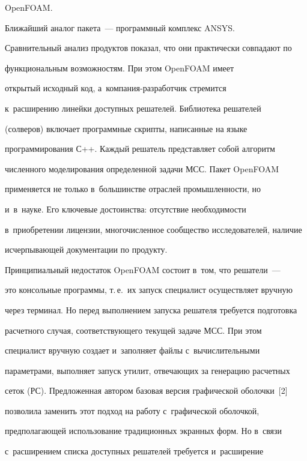 \mbox{OpenFOAM}.


   


   Ближайший аналог пакета~--- программный комплекс ANSYS. 


Сравнительный анализ продуктов показал, что они практически совпадают по 


функциональным возможностям. При этом \mbox{OpenFOAM} имеет 


открытый исходный код, а~ком\-па\-ния-раз\-ра\-бот\-чик стремится 


к~расширению линейки доступных решателей. Библиотека решателей 


(солверов) включает программные скрипты, написанные на языке 


программирования С++. Каждый решатель представляет собой алгоритм 


численного моделирования определенной задачи МСС. Пакет \mbox{OpenFOAM} 


применяется не только в~большинстве отраслей промышленности, но 


и~в~науке. Его ключевые достоинства: отсутствие не\-об\-хо\-ди\-мости 


в~приобретении лицензии, многочисленное сообщество исследователей, наличие 


ис\-чер\-пы\-ва\-ющей документации по продукту.


   


   Принципиальный недостаток OpenFOAM состоит в~том, что решатели~--- 


это консольные программы, т.\,е.\ их запуск специалист осуществляет вручную 


через терминал. Но перед выполнением запуска решателя требуется подготовка 


расчетного случая, соответствующего текущей задаче МСС. При этом 


специалист вручную создает и~заполняет файлы с~вычислительными 


параметрами, выполняет запуск утилит, отвечающих за генерацию расчетных 


сеток (РС). Предложенная автором базовая версия графической оболочки~[2] 


позволила заменить этот подход на работу с~графической оболочкой, 


предполагающей использование традиционных экранных форм. Но в~связи 


с~расширением спис\-ка доступных решателей требуется и~расширение 


